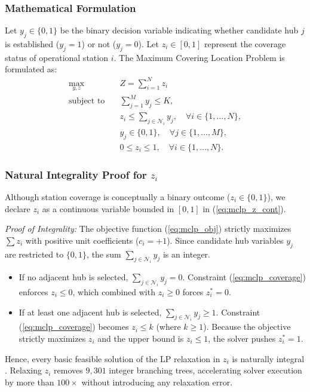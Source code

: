\documentclass[conference]{IEEEtran}
\begin{document}
\subsubsection{Mathematical Formulation}
Let $y_j \in \{0, 1\}$ be the binary decision variable indicating whether candidate hub $j$ is established ($y_j = 1$) or not ($y_j = 0$). Let $z_i \in [0, 1]$ represent the coverage status of operational station $i$. The Maximum Covering Location Problem is formulated as:
\begin{align}
\max_{y, z} \quad & Z = \sum_{i=1}^{N} z_i \label{eq:mclp_obj} \\
\text{subject to} \quad & \sum_{j=1}^{M} y_j \le K, \label{eq:mclp_budget} \\
& z_i \le \sum_{j \in \mathcal{N}_i} y_j, \quad \forall i \in \{1, \dots, N\}, \label{eq:mclp_coverage} \\
& y_j \in \{0, 1\}, \quad \forall j \in \{1, \dots, M\}, \label{eq:mclp_y_bin} \\
& 0 \le z_i \le 1, \quad \forall i \in \{1, \dots, N\}. \label{eq:mclp_z_cont}
\end{align}

\subsubsection{Natural Integrality Proof for $z_i$}
Although station coverage is conceptually a binary outcome ($z_i \in \{0, 1\}$), we declare $z_i$ as a continuous variable bounded in $[0, 1]$ in (\ref{eq:mclp_z_cont}). 

\textit{Proof of Integrality:} The objective function (\ref{eq:mclp_obj}) strictly maximizes $\sum z_i$ with positive unit coefficients ($c_i = +1$). Since candidate hub variables $y_j$ are restricted to $\{0, 1\}$, the sum $\sum_{j \in \mathcal{N}_i} y_j$ is an integer. 
\begin{itemize}
    \item If no adjacent hub is selected, $\sum_{j \in \mathcal{N}_i} y_j = 0$. Constraint (\ref{eq:mclp_coverage}) enforces $z_i \le 0$, which combined with $z_i \ge 0$ forces $z_i^* = 0$.
    \item If at least one adjacent hub is selected, $\sum_{j \in \mathcal{N}_i} y_j \ge 1$. Constraint (\ref{eq:mclp_coverage}) becomes $z_i \le k$ (where $k \ge 1$). Because the objective strictly maximizes $z_i$ and the upper bound is $z_i \le 1$, the solver pushes $z_i^* = 1$.
\end{itemize}
Hence, every basic feasible solution of the LP relaxation in $z_i$ is naturally integral \cite{daskin2013network}. Relaxing $z_i$ removes $9,301$ integer branching trees, accelerating solver execution by more than $100\times$ without introducing any relaxation error.
\end{document}

